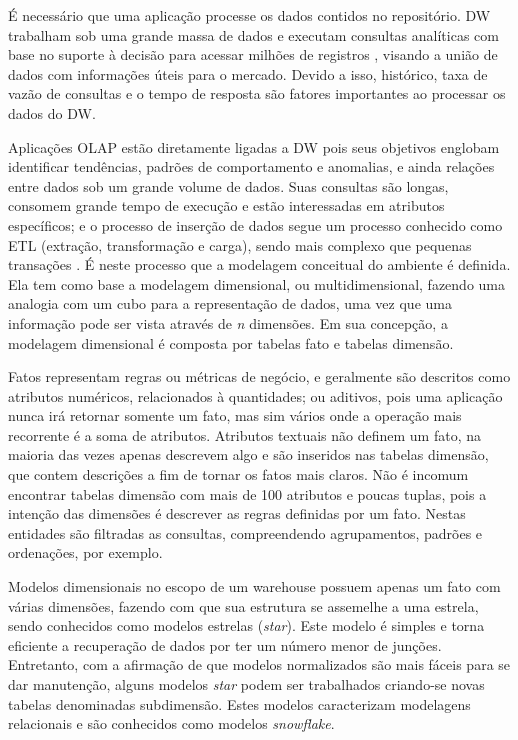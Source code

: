 \documentclass[12pt]{article}
\begin{document}
É necessário que uma aplicação processe os dados contidos no repositório. DW trabalham sob uma grande 
massa de dados e executam consultas analíticas com base no suporte à decisão para acessar milhões de registros 
\cite{chaudhuri1997overview}, visando a união de dados com informações úteis para o mercado. Devido a isso, histórico, 
taxa de vazão de consultas e o tempo de resposta são fatores importantes ao processar os dados do DW.

Aplicações OLAP estão diretamente ligadas a DW pois seus objetivos englobam identificar tendências, 
padrões de comportamento e anomalias, e ainda relações entre dados \cite{codd1998providing} sob um grande 
volume de dados. Suas consultas são longas, consomem grande tempo de execução e estão interessadas em 
atributos específicos; e o processo de inserção de dados segue um processo conhecido como ETL (extração, transformação e carga), 
sendo mais complexo que pequenas transações \cite{vertabelo2017olap}. É neste processo que a modelagem conceitual do ambiente é definida. 
Ela tem como base a modelagem dimensional, ou multidimensional, fazendo uma analogia com um cubo para 
a representação de dados, uma vez que uma informação pode ser vista através de \textit{n} dimensões. 
Em sua concepção, a modelagem dimensional é composta por tabelas fato e tabelas dimensão.

Fatos representam regras ou métricas de negócio, e geralmente são descritos como atributos 
numéricos, relacionados à quantidades; ou aditivos, pois uma aplicação nunca irá retornar somente um fato, 
mas sim vários onde a operação mais recorrente é a soma de atributos.
Atributos textuais não definem um fato, na maioria das vezes apenas descrevem algo e são inseridos 
nas tabelas dimensão, que contem descrições a fim de tornar os fatos mais claros. Não é incomum encontrar tabelas dimensão  
com mais de 100 atributos e poucas tuplas, pois a intenção das dimensões é descrever as regras definidas por um 
fato. Nestas entidades são filtradas as consultas, compreendendo agrupamentos, padrões e ordenações, por exemplo.

Modelos dimensionais no escopo de um warehouse possuem apenas um fato com várias dimensões, fazendo com que 
sua estrutura se assemelhe a uma estrela, sendo conhecidos como modelos estrelas (\textit{star}). Este modelo é 
simples e torna eficiente a recuperação de dados por ter um número menor de junções. Entretanto, com a afirmação de 
que modelos normalizados são mais fáceis para se dar manutenção, alguns modelos \textit{star} podem ser trabalhados 
criando-se novas tabelas denominadas subdimensão. Estes modelos caracterizam modelagens relacionais e são conhecidos 
como modelos \textit{snowflake}.
\end{document}
